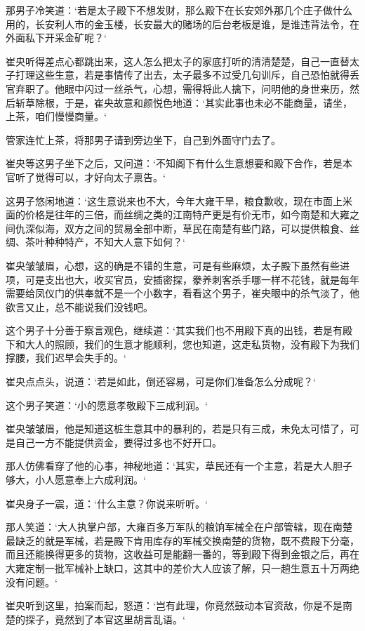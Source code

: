 那男子冷笑道：‘若是太子殿下不想发财，那么殿下在长安郊外那几个庄子做什么用的，长安利人市的金玉楼，长安最大的赌场的后台老板是谁，是谁违背法令，在外面私下开采金矿呢？‘

崔央听得差点心都跳出来，这人怎么把太子的家底打听的清清楚楚，自己一直替太子打理这些生意，若是事情传了出去，太子最多不过受几句训斥，自己恐怕就得丢官弃职了。他眼中闪过一丝杀气，心想，需得将此人擒下，问明他的身世来历，然后斩草除根，于是，崔央故意和颜悦色地道：‘其实此事也未必不能商量，请坐，上茶，咱们慢慢商量。‘

管家连忙上茶，将那男子请到旁边坐下，自己到外面守门去了。

崔央等这男子坐下之后，又问道：‘不知阁下有什么生意想要和殿下合作，若是本官听了觉得可以，才好向太子禀告。‘

这男子悠闲地道：‘这生意说来也不大，今年大雍干旱，粮食歉收，现在市面上米面的价格是往年的三倍，而丝绸之类的江南特产更是有价无市，如今南楚和大雍之间仇深似海，双方之间的贸易全部中断，草民在南楚有些门路，可以提供粮食、丝绸、茶叶种种特产，不知大人意下如何？‘

崔央皱皱眉，心想，这的确是不错的生意，可是有些麻烦，太子殿下虽然有些进项，可是支出也大，收买官员，安插密探，豢养刺客杀手哪一样不花钱，就是每年需要给凤仪门的供奉就不是一个小数字，看看这个男子，崔央眼中的杀气淡了，他欲言又止，总不能说我们没钱吧。

这个男子十分善于察言观色，继续道：‘其实我们也不用殿下真的出钱，若是有殿下和大人的照顾，我们的生意才能顺利，您也知道，这走私货物，没有殿下为我们撑腰，我们迟早会失手的。‘

崔央点点头，说道：‘若是如此，倒还容易，可是你们准备怎么分成呢？‘

这个男子笑道：‘小的愿意孝敬殿下三成利润。‘

崔央皱皱眉，他是知道这桩生意其中的暴利的，若是只有三成，未免太可惜了，可是自己一方不能提供资金，要得过多也不好开口。

那人仿佛看穿了他的心事，神秘地道：‘其实，草民还有一个主意，若是大人胆子够大，小人愿意奉上六成利润。‘

崔央身子一震，道：‘什么主意？你说来听听。‘

那人笑道：‘大人执掌户部，大雍百多万军队的粮饷军械全在户部管辖，现在南楚最缺乏的就是军械，若是殿下肯用库存的军械交换南楚的货物，既不费殿下分毫，而且还能换得更多的货物，这收益可是能翻一番的，等到殿下得到金银之后，再在大雍定制一批军械补上缺口，这其中的差价大人应该了解，只一趟生意五十万两绝没有问题。‘

崔央听到这里，拍案而起，怒道：‘岂有此理，你竟然鼓动本官资敌，你是不是南楚的探子，竟然到了本官这里胡言乱语。‘

